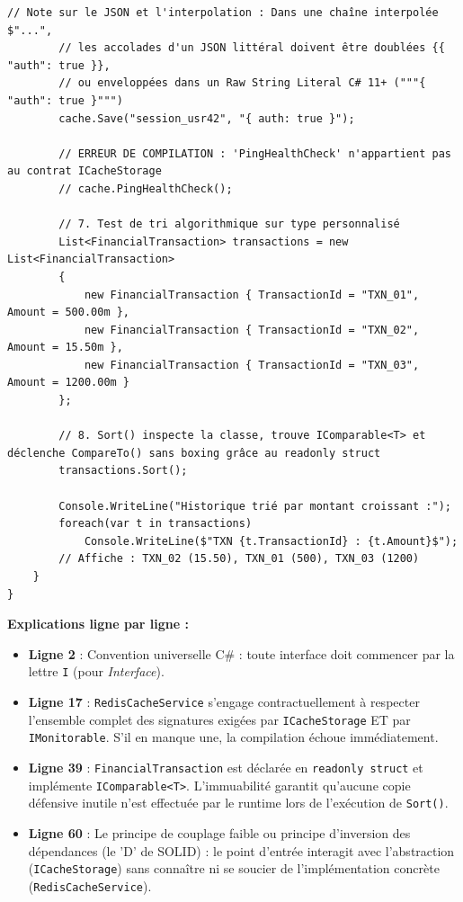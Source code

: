 \begin{lstlisting}[caption={Implémentation multiple et interfaces de tri natives}]
        // Note sur le JSON et l'interpolation : Dans une chaîne interpolée $"...", 
        // les accolades d'un JSON littéral doivent être doublées {{ "auth": true }},
        // ou enveloppées dans un Raw String Literal C# 11+ ("""{ "auth": true }""")
        cache.Save("session_usr42", "{ auth: true }");
        
        // ERREUR DE COMPILATION : 'PingHealthCheck' n'appartient pas au contrat ICacheStorage
        // cache.PingHealthCheck(); 

        // 7. Test de tri algorithmique sur type personnalisé
        List<FinancialTransaction> transactions = new List<FinancialTransaction>
        {
            new FinancialTransaction { TransactionId = "TXN_01", Amount = 500.00m },
            new FinancialTransaction { TransactionId = "TXN_02", Amount = 15.50m },
            new FinancialTransaction { TransactionId = "TXN_03", Amount = 1200.00m }
        };

        // 8. Sort() inspecte la classe, trouve IComparable<T> et déclenche CompareTo() sans boxing grâce au readonly struct
        transactions.Sort(); 
        
        Console.WriteLine("Historique trié par montant croissant :");
        foreach(var t in transactions)
            Console.WriteLine($"TXN {t.TransactionId} : {t.Amount}$");
        // Affiche : TXN_02 (15.50), TXN_01 (500), TXN_03 (1200)
    }
}
\end{lstlisting}

\textbf{Explications ligne par ligne :}
\begin{itemize}
    \item \textbf{Ligne 2} : Convention universelle C\# : toute interface doit commencer par la lettre \texttt{I} (pour \textit{Interface}).
    \item \textbf{Ligne 17} : \texttt{RedisCacheService} s'engage contractuellement à respecter l'ensemble complet des signatures exigées par \texttt{ICacheStorage} ET par \texttt{IMonitorable}. S'il en manque une, la compilation échoue immédiatement.
    \item \textbf{Ligne 39} : \texttt{FinancialTransaction} est déclarée en \texttt{readonly struct} et implémente \texttt{IComparable<T>}. L'immuabilité garantit qu'aucune copie défensive inutile n'est effectuée par le runtime lors de l'exécution de \texttt{Sort()}.
    \item \textbf{Ligne 60} : Le principe de couplage faible ou principe d'inversion des dépendances (le 'D' de SOLID) : le point d'entrée interagit avec l'abstraction (\texttt{ICacheStorage}) sans connaître ni se soucier de l'implémentation concrète (\texttt{RedisCacheService}).
\end{itemize}

